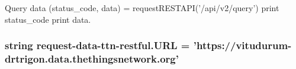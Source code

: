 Query data (status\-\_\-code, data) = request\-R\-E\-S\-T\-A\-P\-I('/api/v2/query') print status\-\_\-code print data. 

\hypertarget{namespacerequest-data-ttn-restful_ae8d40a33afa99acaa57ddcb9e61bcbbe}{
\subsubsection[{U\-R\-L}]{\setlength{\rightskip}{0pt plus 5cm}string request-\/{\bf data}-\/ttn-\/restful.\-U\-R\-L = 'https\-://vitudurum-\/drtrigon.\-data.\-thethingsnetwork.\-org'}}\label{namespacerequest-data-ttn-restful_ae8d40a33afa99acaa57ddcb9e61bcbbe}
